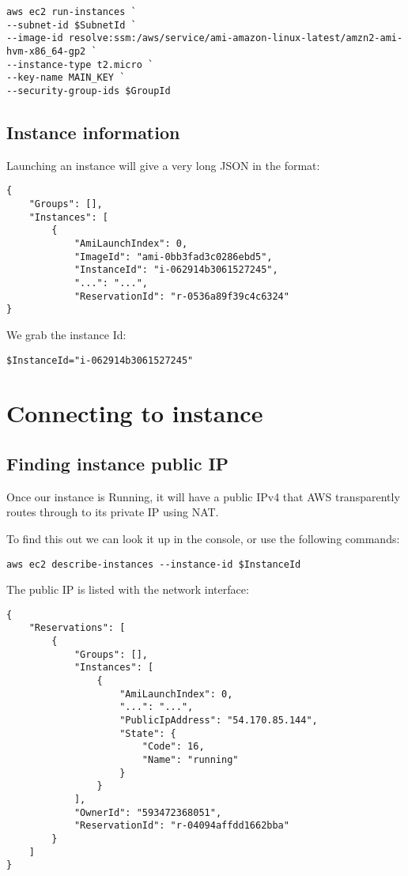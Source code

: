 \begin{verbatim}
aws ec2 run-instances `
--subnet-id $SubnetId `
--image-id resolve:ssm:/aws/service/ami-amazon-linux-latest/amzn2-ami-hvm-x86_64-gp2 `
--instance-type t2.micro `
--key-name MAIN_KEY `
--security-group-ids $GroupId
\end{verbatim}

\subsection{Instance information}\label{instance-information}

Launching an instance will give a very long JSON in the format:

\begin{verbatim}
{
    "Groups": [],
    "Instances": [
        {
            "AmiLaunchIndex": 0,
            "ImageId": "ami-0bb3fad3c0286ebd5",
            "InstanceId": "i-062914b3061527245",
            "...": "...",
            "ReservationId": "r-0536a89f39c4c6324"
}
\end{verbatim}

We grab the instance Id:
\begin{verbatim}
$InstanceId="i-062914b3061527245"
\end{verbatim}

\section{Connecting to instance}\label{sec:connecting-to-instance}

\subsection{Finding instance public
IP}\label{sec:finding-instance-public-ip}

Once our instance is Running, it will have a public IPv4 that AWS
transparently routes through to its private IP using NAT.

To find this out we can look it up in the console, or use the following
commands:

\begin{verbatim}
aws ec2 describe-instances --instance-id $InstanceId
\end{verbatim}

The public IP is listed with the network interface:

\begin{verbatim}
{
    "Reservations": [
        {
            "Groups": [],
            "Instances": [
                {
                    "AmiLaunchIndex": 0,
                    "...": "...",
                    "PublicIpAddress": "54.170.85.144",
                    "State": {
                        "Code": 16,
                        "Name": "running"
                    }
                }
            ],
            "OwnerId": "593472368051",
            "ReservationId": "r-04094affdd1662bba"
        }
    ]
}
\end{verbatim}

